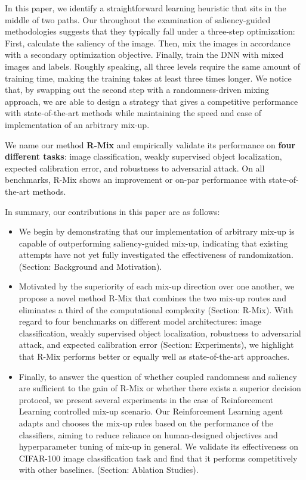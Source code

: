 \documentclass[letterpaper]{article} \usepackage[submission]{aaai23}  \usepackage{times}  \usepackage{helvet}  \usepackage{courier}  \usepackage[hyphens]{url}  \usepackage{graphicx} \urlstyle{rm} \def\UrlFont{\rm}  \usepackage{natbib}  \usepackage{caption} \frenchspacing  \setlength{\pdfpagewidth}{8.5in} \setlength{\pdfpageheight}{11in}
\newcommand{\rrlmix}{{R-Mix}}
\newcommand{\cifar}{CIFAR-100}
\begin{document}
 In this paper, we identify a straightforward learning heuristic that sits in the middle of two paths. Our throughout the examination of saliency-guided methodologies suggests that they typically fall under a three-step optimization: First, calculate the saliency of the image. Then, mix the images in accordance with a secondary optimization objective. Finally, train the DNN with mixed images and labels. Roughly speaking, all three levels require the same amount of training time, making the training takes at least three times longer. We notice that, by swapping out the second step with a randomness-driven mixing approach, we are able to design a strategy that gives a competitive performance with state-of-the-art methods while maintaining the speed and ease of implementation of an arbitrary mix-up.

We name our method \textbf{\rrlmix{}} and empirically validate its performance on \textbf{four different tasks}: image classification, weakly supervised object localization, expected calibration error, and robustness to adversarial attack. On all benchmarks, \rrlmix{} shows an improvement or on-par performance with state-of-the-art methods. 

In summary, our contributions in this paper are as follows:
\begin{itemize}
    \item We begin by demonstrating that our implementation of arbitrary mix-up is capable of outperforming saliency-guided mix-up, indicating that existing attempts have not yet fully investigated the effectiveness of randomization. (Section: Background and Motivation).
    
    \item Motivated by the superiority of each mix-up direction over one another, we propose a novel method \rrlmix{} that combines the two mix-up routes and eliminates a third of the computational complexity (Section: R-Mix). With regard to four benchmarks on different model architectures: image classification, weakly supervised object localization, robustness to adversarial attack, and expected calibration error (Section: Experiments), we highlight that \rrlmix{} performs better or equally well as state-of-the-art approaches.
    
    \item Finally, to answer the question of whether coupled randomness and saliency are sufficient to the gain of \rrlmix{} or whether there exists a superior decision protocol, we present several experiments in the case of Reinforcement Learning controlled mix-up scenario. Our Reinforcement Learning agent adapts and chooses the mix-up rules based on the performance of the classifiers, aiming to reduce reliance on human-designed objectives and hyperparameter tuning of mix-up in general. We validate its effectiveness on \cifar{} image classification task and find that it performs competitively with other baselines. (Section: Ablation Studies).
\end{itemize} 
\end{document}

